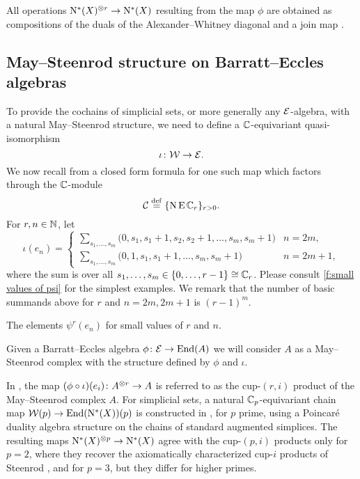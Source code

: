 \begin{remark*}
	All operations $\operatorname{N^{\ast}}(X)^{\otimes r} \to \operatorname{N^{\ast}}(X)$ resulting from the map $\phi$ are obtained as compositions of the duals of the Alexander--Whitney diagonal and a join map \cite{medina2020prop1, medina2021prop2}.
\end{remark*}

\subsection{May--Steenrod structure on Barratt--Eccles algebras}\label{ss:may-steenrod on barratt-eccles}

To provide the cochains of simplicial sets, or more generally any $\mathcal{E}$-algebra, with a natural May--Steenrod structure, we need to define a $\mathbb{C}$-equivariant quasi-isomorphism
\[
\iota \colon \mathcal{W} \to \mathcal{E}.
\]
We now recall from \cite{medina2021may_st} a closed form formula for one such map which factors through the $\mathbb{C}$-module
\[
\mathcal{C} \stackrel{\mathrm{def}}{=} \{\operatorname{N}\operatorname{E}\mathbb{C}_r\}_{r>0}.
\]
For $r,n\in\mathbb{N}$, let
\[
\iota(e_{n}) =
\begin{cases}
	\displaystyle{\sum_{s_1, \dots, s_m}} \big(0, {s_1}, {s_1+1}, {s_2}, {s_2+1}, \dots, {s_{m}}, {s_{m}+1} \big) & n = 2m, \\
	\displaystyle{\sum_{s_1, \dots, s_m}} \big(0, 1, {s_1}, {s_1+1}, \dots, {s_{m}}, {s_{m}+1} \big) & n = 2m+1,
\end{cases}
\]
where the sum is over all $s_1, \dots, s_m \in \{0, \dots, r-1\} \cong \mathbb{C}_r$.
Please consult \cref{f:small values of psi} for the simplest examples.
We remark that the number of basic summands above for $r$ and $n = 2m, 2m + 1$ is $(r-1)^m$.

\begin{table}
	\centering
	
	\caption{The elements $\psi^r(e_n)$ for small values of $r$ and $n$.}
	\label{f:small values of psi}
\end{table}

Given a Barratt--Eccles algebra $\phi \colon \mathcal{E} \to \mathrm{End}(A)$ we will consider $A$ as a May--Steenrod complex with the structure defined by $\phi$ and $\iota$.

\begin{remark*}
	In \cite{medina2021may_st}, the map $(\phi \mathbin{\circ} \iota)(e_i) \colon A^{\otimes r} \to A$ is referred to as the cup-$(r,i)$ product of the May--Steenrod complex $A$.
	For simplicial sets, a natural $\mathbb{C}_p$-equivariant chain map $\mathcal{W}(p) \to \mathrm{End}(\operatorname{N^{\ast}}(X))(p)$ is constructed in \cite{medina2024connected}, for $p$ prime, using a Poincar\'e duality algebra structure on the chains of standard augmented simplices.
	The resulting maps $\operatorname{N^{\ast}}(X)^{\otimes p} \to \operatorname{N^{\ast}}(X)$ agree with the cup-$(p,i)$ products only for $p=2$, where they recover the axiomatically characterized cup-$i$ products of Steenrod \cite{steenrod1947products, medina2023fast_sq, medina2022axiomatic}, and for $p=3$, but they differ for higher primes.
\end{remark*}

